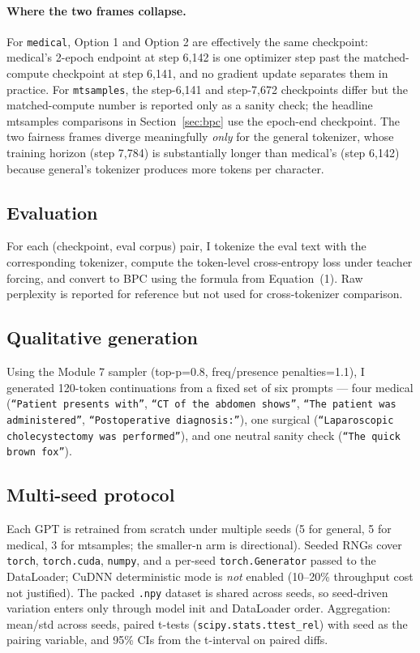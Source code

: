 \documentclass[11pt]{article}
\begin{document}
\paragraph{Where the two frames collapse.} For \texttt{medical}, Option 1 and Option 2 are effectively the same checkpoint: medical's 2-epoch endpoint at step 6{,}142 is one optimizer step past the matched-compute checkpoint at step 6{,}141, and no gradient update separates them in practice. For \texttt{mtsamples}, the step-6,141 and step-7,672 checkpoints differ but the matched-compute number is reported only as a sanity check; the headline mtsamples comparisons in Section~\ref{sec:bpc} use the epoch-end checkpoint. The two fairness frames diverge meaningfully \emph{only} for the general tokenizer, whose training horizon (step 7,784) is substantially longer than medical's (step 6,142) because general's tokenizer produces more tokens per character.

\subsection{Evaluation}

For each (checkpoint, eval corpus) pair, I tokenize the eval text with the corresponding tokenizer, compute the token-level cross-entropy loss under teacher forcing, and convert to BPC using the formula from Equation~(1). Raw perplexity is reported for reference but not used for cross-tokenizer comparison.

\subsection{Qualitative generation}

Using the Module 7 sampler (top-p=0.8, freq/presence penalties=1.1), I generated 120-token continuations from a fixed set of six prompts --- four medical (\texttt{``Patient presents with''}, \texttt{``CT of the abdomen shows''}, \texttt{``The patient was administered''}, \texttt{``Postoperative diagnosis:''}), one surgical (\texttt{``Laparoscopic cholecystectomy was performed''}), and one neutral sanity check (\texttt{``The quick brown fox''}).

\subsection{Multi-seed protocol}

Each GPT is retrained from scratch under multiple seeds (5 for general, 5 for medical, 3 for mtsamples; the smaller-n arm is directional). Seeded RNGs cover \texttt{torch}, \texttt{torch.cuda}, \texttt{numpy}, and a per-seed \texttt{torch.Generator} passed to the DataLoader; CuDNN deterministic mode is \emph{not} enabled (10--20\% throughput cost not justified). The packed \texttt{.npy} dataset is shared across seeds, so seed-driven variation enters only through model init and DataLoader order. Aggregation: mean/std across seeds, paired t-tests (\texttt{scipy.stats.ttest\_rel}) with seed as the pairing variable, and 95\% CIs from the t-interval on paired diffs.
\end{document}
